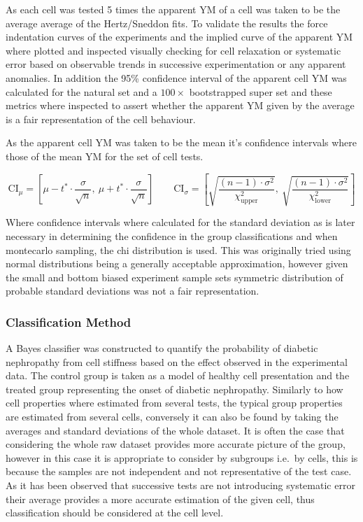 \documentclass[
  paper=a4,
  ,captions=tableheading
]{scrartcl}
\begin{document}
As each cell was tested 5 times the apparent YM of a cell was taken to
be the average average of the Hertz/Sneddon fits. To validate the
results the force indentation curves of the experiments and the implied
curve of the apparent YM where plotted and inspected visually checking
for cell relaxation or systematic error based on observable trends in
successive experimentation or any apparent anomalies. In addition the
95\% confidence interval of the apparent cell YM was calculated for the
natural set and a \(100 \times\) bootstrapped super set and these
metrics where inspected to assert whether the apparent YM given by the
average is a fair representation of the cell behaviour.

As the apparent cell YM was taken to be the mean it's confidence
intervals where those of the mean YM for the set of cell tests.

\[\text{CI}_\mu = \left[ \mu - t^* \cdot \frac{\sigma}{\sqrt{n}},\ \mu + t^* \cdot \frac{\sigma}{\sqrt{n}} \right]
\qquad
\text{CI}_\sigma = \left[ \sqrt{ \frac{(n-1) \cdot \sigma^2}{\chi^2_{\text{upper}}} },\ \sqrt{ \frac{(n-1) \cdot \sigma^2}{\chi^2_{\text{lower}}} } \right]
\]

Where confidence intervals where calculated for the standard deviation
as is later necessary in determining the confidence in the group
classifications and when montecarlo sampling, the chi distribution is
used. This was originally tried using normal distributions being a
generally acceptable approximation, however given the small and bottom
biased experiment sample sets symmetric distribution of probable
standard deviations was not a fair representation.

\subsubsection{Classification Method}\label{classification-method}

A Bayes classifier was constructed to quantify the probability of
diabetic nephropathy from cell stiffness based on the effect observed in
the experimental data. The control group is taken as a model of healthy
cell presentation and the treated group representing the onset of
diabetic nephropathy. Similarly to how cell properties where estimated
from several tests, the typical group properties are estimated from
several cells, conversely it can also be found by taking the averages
and standard deviations of the whole dataset. It is often the case that
considering the whole raw dataset provides more accurate picture of the
group, however in this case it is appropriate to consider by subgroups
i.e.~by cells, this is because the samples are not independent and not
representative of the test case. As it has been observed that successive
tests are not introducing systematic error their average provides a more
accurate estimation of the given cell, thus classification should be
considered at the cell level.
\end{document}
